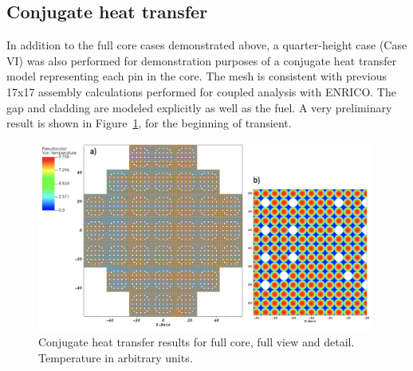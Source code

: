 \subsection{Conjugate heat transfer}
\label{sec:results4}

In addition to the full core cases demonstrated above, a quarter-height case (Case VI) was also performed for demonstration purposes of a conjugate heat transfer model representing each pin in the core. The mesh is consistent with previous 17x17 assembly calculations performed for coupled analysis with ENRICO. The gap and cladding are modeled explicitly as well as the fuel. A very preliminary result is shown in Figure~\ref{fig:cht}, for the beginning of transient.

\begin{figure}[!ht]
\centering
\includegraphics[width=0.99\textwidth]{./figures/quarter_cht.png}
\caption{Conjugate heat transfer results for full core, full view and detail. Temperature in arbitrary units.}
\label{fig:cht}
\end{figure}
